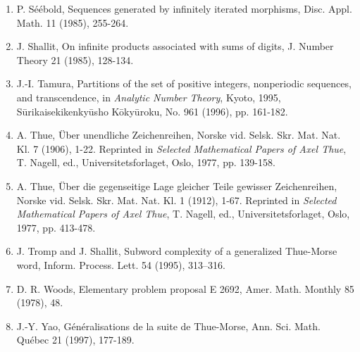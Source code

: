 \documentclass[10pt]{article}
\begin{document}
\begin{enumerate}
  \item P. Séébold, Sequences generated by infinitely iterated morphisms, Disc. Appl. Math. 11 (1985), 255-264.
  \item J. Shallit, On infinite products associated with sums of digits, J. Number Theory 21 (1985), 128-134.
  \item J.-I. Tamura, Partitions of the set of positive integers, nonperiodic sequences, and transcendence, in \emph{Analytic Number Theory}, Kyoto, 1995, Sūrikaisekikenkyūsho Kōkyūroku, No. 961 (1996), pp. 161-182.
  \item A. Thue, Über unendliche Zeichenreihen, Norske vid. Selsk. Skr. Mat. Nat. Kl. 7 (1906), 1-22. Reprinted in \emph{Selected Mathematical Papers of Axel Thue}, T. Nagell, ed., Universitetsforlaget, Oslo, 1977, pp. 139-158.
  \item A. Thue, Über die gegenseitige Lage gleicher Teile gewisser Zeichenreihen, Norske vid. Selsk. Skr. Mat. Nat. Kl. 1 (1912), 1-67. Reprinted in \emph{Selected Mathematical Papers of Axel Thue}, T. Nagell, ed., Universitetsforlaget, Oslo, 1977, pp. 413-478.
  \item J. Tromp and J. Shallit, Subword complexity of a generalized Thue-Morse word, Inform. Process. Lett. 54 (1995), 313--316.
  \item D. R. Woods, Elementary problem proposal E 2692, Amer. Math. Monthly 85 (1978), 48.
  \item J.-Y. Yao, Généralisations de la suite de Thue-Morse, Ann. Sci. Math. Québec 21 (1997), 177-189.
\end{enumerate}
\end{document}
